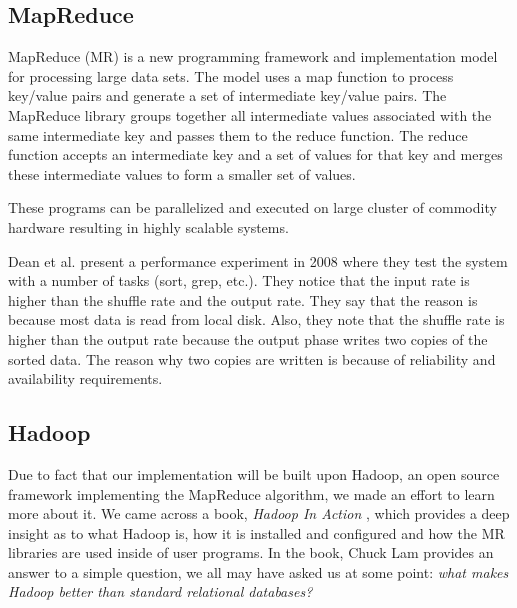 \documentclass[twocolumn]{article}
\begin{document}
\subsection{MapReduce}

MapReduce (MR) is a new programming framework and implementation model for
processing large data sets. The model uses a map function to process key/value pairs and generate a
set of intermediate key/value pairs. The MapReduce library groups together all intermediate values
associated with the same intermediate key and passes them to the reduce function. The reduce
function accepts an intermediate key and a set of values for that key and merges these intermediate
values to form a smaller set of values.

These programs can be parallelized and executed on large cluster of commodity hardware
resulting in highly scalable systems.

Dean et al. present a performance experiment in 2008 \cite{ref:simplified}
 where they test the system with a number
of tasks (sort, grep, etc.). They notice that the input rate is higher than the shuffle rate and the output
rate. They say that the reason is because most data is read from local disk. Also, they note that the
shuffle rate is higher than the output rate because the output phase writes two copies of the sorted
data. The reason why two copies are written is because of reliability and availability requirements.

\subsection{Hadoop}

Due to fact that our implementation will be built upon Hadoop, an open source framework
implementing the MapReduce algorithm, we made an effort to learn more about it. We came
across a book, \emph{Hadoop In Action} \cite{ref:hadoop-in-action}, which
provides a deep insight as to what Hadoop is, how it is installed and configured and how the MR
libraries are used inside of user programs. In the book, Chuck Lam provides an answer to a simple
question, we all may have asked us at some point: \emph{what makes Hadoop better than standard relational
databases?}
\end{document}
